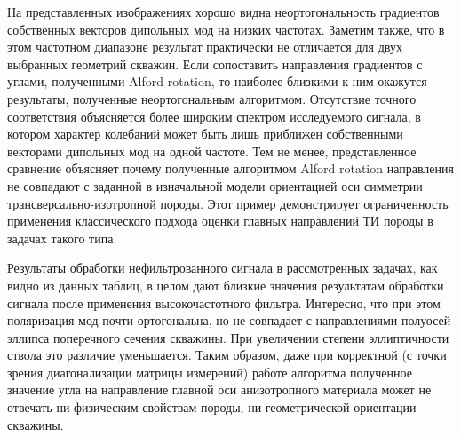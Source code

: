\documentclass[a4paper,11pt]{article}
\begin{document}
На представленных изображениях хорошо видна неортогональность градиентов собственных векторов дипольных мод на низких частотах. Заметим также, что в этом частотном диапазоне результат практически не отличается для двух выбранных геометрий скважин. Если сопоставить направления градиентов с углами, полученными Alford rotation, то наиболее близкими к ним окажутся результаты, полученные неортогональным алгоритмом. Отсутствие точного соответствия объясняется более широким спектром исследуемого сигнала, в котором характер колебаний может быть лишь приближен собственными векторами дипольных мод на одной частоте. Тем не менее, представленное сравнение объясняет почему полученные алгоритмом Alford rotation направления не совпадают с заданной в изначальной модели ориентацией оси симметрии трансверсально-изотропной породы. Этот пример демонстрирует ограниченность применения классического подхода оценки главных направлений ТИ породы в задачах такого типа. 


Результаты обработки нефильтрованного сигнала в рассмотренных задачах, как видно из данных таблиц, в целом дают близкие значения результатам обработки сигнала после применения высокочастотного фильтра. Интересно, что при этом поляризация мод почти ортогональна, но не совпадает с направлениями полуосей эллипса поперечного сечения скважины. При увеличении степени эллиптичности ствола это различие уменьшается. Таким образом, даже при корректной (с точки зрения диагонализации матрицы измерений) работе алгоритма полученное значение угла на направление главной оси анизотропного материала может не отвечать ни физическим свойствам породы, ни геометрической ориентации скважины. 
\end{document}
